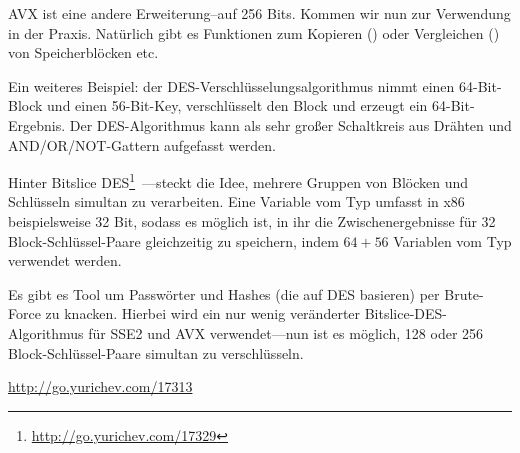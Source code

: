 AVX ist eine andere Erweiterung--auf 256 Bits.
Kommen wir nun zur Verwendung in der Praxis.
Natürlich gibt es Funktionen zum Kopieren () oder Vergleichen () von Speicherblöcken etc.

Ein weiteres Beispiel: der DES-Verschlüsselungsalgorithmus nimmt einen 64-Bit-Block und einen 56-Bit-Key, verschlüsselt
den Block und erzeugt ein 64-Bit-Ergebnis. 
Der DES-Algorithmus kann als sehr großer Schaltkreis aus Drähten und AND/OR/NOT-Gattern aufgefasst werden.

\label{bitslicedes}
\newcommand{\URLBS}{\url{http://go.yurichev.com/17329}}
Hinter Bitslice DES\footnote{\URLBS}~---steckt die Idee, mehrere Gruppen von Blöcken und Schlüsseln simultan zu
verarbeiten. Eine Variable vom Typ  umfasst in x86 beispielsweise 32 Bit, sodass es möglich ist, in ihr
die Zwischenergebnisse für 32 Block-Schlüssel-Paare gleichzeitig zu speichern, indem $64+56$ Variablen vom Typ
 verwendet werden.

\myindex{\oracle}
Es gibt es Tool um \oracle Passwörter und Hashes (die auf DES basieren) per Brute-Force zu knacken. Hierbei wird ein nur
wenig veränderter Bitslice-DES-Algorithmus für SSE2 und AVX verwendet---nun ist es möglich, 128 oder 256
Block-Schlüssel-Paare simultan zu verschlüsseln.

\url{http://go.yurichev.com/17313}




